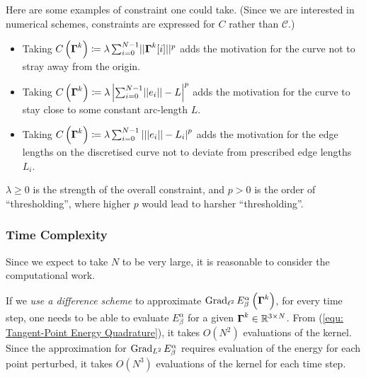 \documentclass[../dissertation.tex]{subfiles}
\begin{document}
Here are some examples of constraint one could take. 
(Since we are interested in numerical schemes, constraints are expressed for $C$ rather than $\mathcal{C}$.)
\begin{itemize}
    \item Taking $C \left( \boldsymbol{\Gamma}^k \right) \coloneqq \lambda \sum_{i=0}^{N-1} \lvert \lvert \boldsymbol{\Gamma}^k [i] \rvert \rvert^p$ adds the motivation for the curve not to stray away from the origin.
    \item Taking $C \left( \boldsymbol{\Gamma}^k \right) \coloneqq \lambda \left| \sum_{i=0}^{N-1} \lvert \lvert e_i \rvert \rvert - L \right|^p$ adds the motivation for the curve to stay close to some constant arc-length $L$.
    \item Taking $C \left( \boldsymbol{\Gamma}^k \right) \coloneqq \lambda \sum_{i=0}^{N-1} \left| \lvert \lvert e_i \rvert \rvert - L_i \right|^p$ adds the motivation for the edge lengths on the discretised curve not to deviate from prescribed edge lengths $L_i$.
\end{itemize}
$\lambda \geq 0$ is the strength of the overall constraint, and
$p > 0$ is the order of ``thresholding'', where higher $p$ would lead to harsher ``thresholding''.

\subsubsection{Time Complexity}
\label{sct: L2 Complexity}
Since we expect to take $N$ to be very large, it is reasonable to consider the computational work.

If we \textit{use a difference scheme} to approximate $\operatorname{Grad}_{\ell^2} E_{\beta}^\alpha \left( \boldsymbol{\Gamma}^k \right)$,
for every time step, one needs to be able to evaluate $E_{\beta}^\alpha$ for a given $\boldsymbol{\Gamma}^k \in \mathbb{R}^{3\times N}$.
From (\ref{equ: Tangent-Point Energy Quadrature}),
it takes $O \left( N^2 \right)$ evaluations of the kernel.
Since the approximation for $\operatorname{Grad}_{L^2} E_\beta^\alpha$ requires evaluation of the energy for each point perturbed, it takes $O \left( N^3 \right)$ evaluations of the kernel for each time step. 
\end{document}
